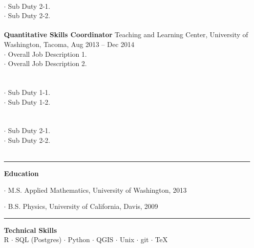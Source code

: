 \documentclass[letterpaper, onecolumn, oneside]{article}
\newcommand{\dotindent}{\hspace*{.25in}$\cdot$ }
\newcommand{\spaceindent}{\hspace*{0.1in}}
\begin{document}
\begin{flushleft}
\spaceindent {\bf Major Sub Duty 2} \\
\dotindent Sub Duty 2-1.\\
\dotindent Sub Duty 2-2.\\
~\\



\textbf{\large Quantitative Skills Coordinator} Teaching and Learning Center, University of Washington, Tacoma, Aug 2013 -- Dec 2014 \\
\dotindent Overall Job Description 1. \\
\dotindent Overall Job Description 2.\\
~\\

\spaceindent {\bf Major Sub Duty 1} \\
\dotindent Sub Duty 1-1.\\
\dotindent Sub Duty 1-2.\\
~\\

\spaceindent {\bf Major Sub Duty 2} \\
\dotindent Sub Duty 2-1.\\
\dotindent Sub Duty 2-2.\\
~\\

\textcolor{litegrey}{\rule{\textwidth}{.1pt}}

\vspace*{0.1in}
\textbf{\large Education}
\vspace*{0.05in}

\dotindent M.S. Applied Mathematics, University of Washington, 2013

\dotindent B.S. Physics, University of California, Davis, 2009

\textcolor{litegrey}{\rule{\textwidth}{.1pt}}

\end{flushleft}


\begin{centering}

{\bf Technical Skills} \\
R $\cdot$ SQL (Postgres)  $\cdot$ Python  $\cdot$ QGIS   $\cdot$  Unix   $\cdot$  git   $\cdot$  \TeX \\ 

\end{centering}
\end{document}
